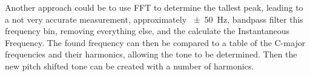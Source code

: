 Another approach could be to use FFT to determine the tallest peak, leading to a not very accurate measurement, approximately \SI{\pm50}{\hertz}, bandpass filter this frequency bin, removing everything else, and the calculate the Instantaneous Frequency.
The found frequency can then be compared to a table of the C-major frequencies and their harmonics, allowing the tone to be determined.
Then the new pitch shifted tone can be created with a number of harmonics.